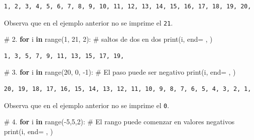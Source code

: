 \documentclass[
  spanish,
  letterpaper,
]{scrbook}
\newenvironment{Shaded}{\begin{snugshade}}{\end{snugshade}}
\newcommand{\BuiltInTok}[1]{\textcolor[rgb]{0.00,0.23,0.31}{#1}}
\newcommand{\CommentTok}[1]{\textcolor[rgb]{0.37,0.37,0.37}{#1}}
\newcommand{\ControlFlowTok}[1]{\textcolor[rgb]{0.00,0.23,0.31}{\textbf{#1}}}
\newcommand{\DecValTok}[1]{\textcolor[rgb]{0.68,0.00,0.00}{#1}}
\newcommand{\KeywordTok}[1]{\textcolor[rgb]{0.00,0.23,0.31}{\textbf{#1}}}
\newcommand{\NormalTok}[1]{\textcolor[rgb]{0.00,0.23,0.31}{#1}}
\newcommand{\OperatorTok}[1]{\textcolor[rgb]{0.37,0.37,0.37}{#1}}
\newcommand{\StringTok}[1]{\textcolor[rgb]{0.13,0.47,0.30}{#1}}
\theoremstyle{definition}
\theoremstyle{remark}
\begin{document}
\begin{verbatim}
1, 2, 3, 4, 5, 6, 7, 8, 9, 10, 11, 12, 13, 14, 15, 16, 17, 18, 19, 20, 
\end{verbatim}

Observa que en el ejemplo anterior no se imprime el \texttt{21}.

\begin{Shaded}
\begin{Highlighting}[]
\CommentTok{\# 2.}
\ControlFlowTok{for}\NormalTok{ i }\KeywordTok{in} \BuiltInTok{range}\NormalTok{(}\DecValTok{1}\NormalTok{, }\DecValTok{21}\NormalTok{, }\DecValTok{2}\NormalTok{): }\CommentTok{\# saltos de dos en dos}
    \BuiltInTok{print}\NormalTok{(i, end}\OperatorTok{=} \StringTok{\textquotesingle{}, \textquotesingle{}}\NormalTok{)}
\end{Highlighting}
\end{Shaded}

\begin{verbatim}
1, 3, 5, 7, 9, 11, 13, 15, 17, 19, 
\end{verbatim}

\begin{Shaded}
\begin{Highlighting}[]
\CommentTok{\# 3.}
\ControlFlowTok{for}\NormalTok{ i }\KeywordTok{in} \BuiltInTok{range}\NormalTok{(}\DecValTok{20}\NormalTok{, }\DecValTok{0}\NormalTok{, }\OperatorTok{{-}}\DecValTok{1}\NormalTok{): }\CommentTok{\# El paso puede ser negativo}
    \BuiltInTok{print}\NormalTok{(i, end}\OperatorTok{=} \StringTok{\textquotesingle{}, \textquotesingle{}}\NormalTok{)}
\end{Highlighting}
\end{Shaded}

\begin{verbatim}
20, 19, 18, 17, 16, 15, 14, 13, 12, 11, 10, 9, 8, 7, 6, 5, 4, 3, 2, 1, 
\end{verbatim}

Observa que en el ejemplo anterior no se imprime el \texttt{0}.

\begin{Shaded}
\begin{Highlighting}[]
\CommentTok{\# 4.}
\ControlFlowTok{for}\NormalTok{ i }\KeywordTok{in} \BuiltInTok{range}\NormalTok{(}\OperatorTok{{-}}\DecValTok{5}\NormalTok{,}\DecValTok{5}\NormalTok{,}\DecValTok{2}\NormalTok{):  }\CommentTok{\# El rango puede comenzar en valores negativos }
    \BuiltInTok{print}\NormalTok{(i, end}\OperatorTok{=} \StringTok{\textquotesingle{}, \textquotesingle{}}\NormalTok{)}
\end{Highlighting}
\end{Shaded}
\end{document}
